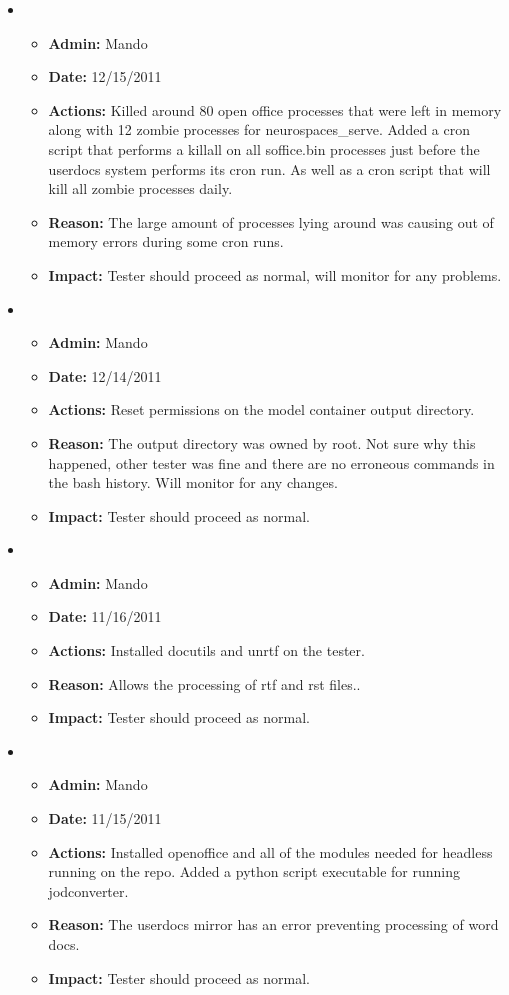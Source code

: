 \documentclass[12pt]{article}
\begin{document}
\begin{itemize}
\item
  \begin{itemize}
  \item[] {\bf Admin:} Mando
  \item[] {\bf Date:} 12/15/2011
  \item[] {\bf Actions:} Killed around 80 open office processes that were left in memory along with 12 zombie processes for neurospaces\_serve.  Added a cron script that performs a killall on all soffice.bin processes just before the userdocs system performs its cron run. As well as a cron script that will kill all zombie processes daily.
  \item[] {\bf Reason:} The large amount of processes lying around was causing out of memory errors during some cron runs. 
  \item[] {\bf Impact:} Tester should proceed as normal, will monitor for any problems.
  \end{itemize}
  
\item
  \begin{itemize}
  \item[] {\bf Admin:} Mando
  \item[] {\bf Date:} 12/14/2011
  \item[] {\bf Actions:} Reset permissions on the model container output directory.
  \item[] {\bf Reason:} The output directory was owned by root. Not sure why this happened, other tester was fine and there are no erroneous commands in the bash history. Will monitor for any changes.
  \item[] {\bf Impact:} Tester should proceed as normal.
  \end{itemize}
  
\item
  \begin{itemize}
  \item[] {\bf Admin:} Mando
  \item[] {\bf Date:} 11/16/2011
  \item[] {\bf Actions:} Installed docutils and unrtf on the tester.
  \item[] {\bf Reason:} Allows the processing of rtf and rst files.. 
  \item[] {\bf Impact:} Tester should proceed as normal.
  \end{itemize}
  
\item
  \begin{itemize}
  \item[] {\bf Admin:} Mando
  \item[] {\bf Date:} 11/15/2011
  \item[] {\bf Actions:} Installed openoffice and all of the modules needed for headless running on the repo. Added a python script executable for running jodconverter.
  \item[] {\bf Reason:} The userdocs mirror has an error preventing processing of word docs. 
  \item[] {\bf Impact:} Tester should proceed as normal.
  \end{itemize}
  

\end{itemize}
\end{document}
